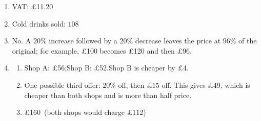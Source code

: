 \documentclass[11pt,a4paper]{article}
\begin{document}
\begin{enumerate}
\item VAT: \pounds11.20

\item Cold drinks sold: \(108\)

\item No. A \(20\%\) increase followed by a \(20\%\) decrease leaves the price at \(96\%\) of the original; for example, \pounds100 becomes \pounds120 and then \pounds96.

\item
\begin{enumerate}
  \item Shop A: \pounds56;\quad Shop B: \pounds52.\quad Shop B is cheaper by \pounds4.
  \item One possible third offer: \(20\%\) off, then \(\pounds15\) off. This gives \pounds49, which is cheaper than both shops and is more than half price.
  \item \pounds160\ (both shops would charge \pounds112)
\end{enumerate}

\end{enumerate}
\end{document}

